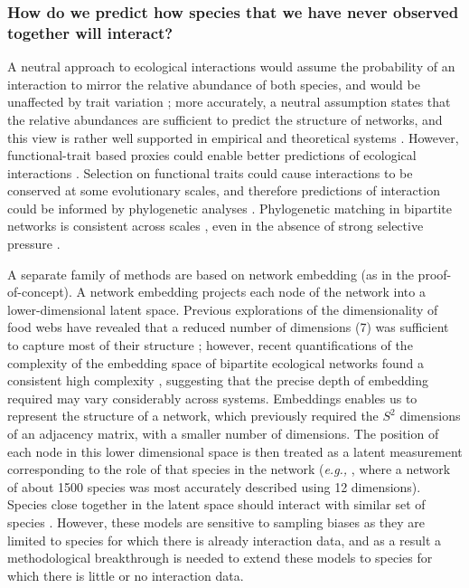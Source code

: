 \subsubsection{How do we predict how species that we have never observed
together will
interact?}\label{how-do-we-predict-how-species-that-we-have-never-observed-together-will-interact}

A neutral approach to ecological interactions would assume the
probability of an interaction to mirror the relative abundance of both
species, and would be unaffected by trait variation
\cite{Poisot2015SpeWhy, Pichler2020MacLea}; more accurately, a neutral
assumption states that the relative abundances are sufficient to predict
the structure of networks, and this view is rather well supported in
empirical and theoretical systems \cite{Canard2012EmeStr,
Canard2014EmpEva}. However, functional-trait based proxies could
enable better predictions of ecological interactions
\cite{Cirtwill2018FeeEnv, Cirtwill2019QuaFra, Bartomeus2016ComFra,
Bartomeus2013UndLin}. Selection on functional traits could cause
interactions to be conserved at some evolutionary scales, and therefore
predictions of interaction could be informed by phylogenetic analyses
\cite{Davies2021EcoRed, Elmasri2020HieBay, Gomez2010EcoInt}.
Phylogenetic matching in bipartite networks is consistent across scales
\cite{Poisot2018IntRet}, even in the absence of strong selective
pressure \cite{Coelho2017NeuBio}.

A separate family of methods are based on network embedding (as in the
proof-of-concept). A network embedding projects each node of the network
into a lower-dimensional latent space. Previous explorations of the
dimensionality of food webs have revealed that a reduced number of
dimensions (7) was sufficient to capture most of their structure
\cite{Eklof2013DimEco}; however, recent quantifications of the
complexity of the embedding space of bipartite ecological networks found
a consistent high complexity \cite{Strydom2021SvdEnt}, suggesting that
the precise depth of embedding required may vary considerably across
systems. Embeddings enables us to represent the structure of a network,
which previously required the \(S^2\) dimensions of an adjacency matrix,
with a smaller number of dimensions. The position of each node in this
lower dimensional space is then treated as a latent measurement
corresponding to the role of that species in the network (\emph{e.g.,}
\cite{Poisot2021ImpMam}, where a network of about 1500 species was most
accurately described using 12 dimensions). Species close together in
the latent space should interact with similar set of species
\cite{Rossberg2006FooWeb, Rohr2010ModFoo}. However, these models are
sensitive to sampling biases as they are limited to species for which
there is already interaction data, and as a result a methodological
breakthrough is needed to extend these models to species for which there
is little or no interaction data.

